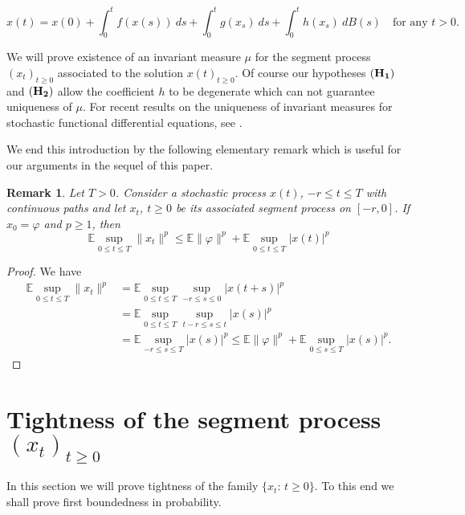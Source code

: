 \documentclass[11pt,reqno,draft]{amsart}
\newtheorem{rem}[defi]{Remark}
\begin{document}
$$
x(t)=x(0)+\int_0^tf(x(s))\:ds+\int_0^tg(x_s)\:ds+\int_0^th(x_s)\:dB(s)\quad
\mbox{for any $t>0$}.
$$

\noindent We will prove existence of an invariant measure $\mu$ for
the segment process $(x_t)_{t\geq0}$ associated to the solution
$x(t)_{t\geq 0}$. Of course our hypotheses ${\bf(H_1)}$ and
${\bf(H_2)}$ allow the coefficient $h$ to be degenerate which can
not guarantee uniqueness of $\mu$. For recent results on the
uniqueness of invariant measures for stochastic functional
differential equations, see \cite{HMS}.

\noindent We end this introduction by the
following elementary remark which is useful for our arguments in the
sequel of this paper.

\begin{rem}
Let $T>0$. Consider a stochastic process $x(t)$, $-r \le t \le T$ with continuous paths
and let $x_t$, $t\geq0$ be its associated segment process on
$[-r,0]$. If $x_0=\varphi$ and $p \ge 1$, then
\begin{equation*}
{\mathbb E}\sup\limits_{0\leq t\leq T}\|x_t\|^p\leq
{\mathbb E}\|\varphi\|^p+{\mathbb E}\sup\limits_{0\leq t\leq T}|x(t)|^p
\end{equation*}
\end{rem}
\begin{proof}
We have
\begin{equation*}
\begin{split}
{\mathbb E}\sup\limits_{0\leq t\leq T}\|x_t\|^p&={\mathbb E}\sup\limits_{0\leq t\leq
T}\sup\limits_{-r\leq s\leq 0}|x(t+s)|^p\\
&={\mathbb E}\sup\limits_{0\leq t\leq T}\sup\limits_{t-r\leq s\leq
t}|x(s)|^p\\
&={\mathbb E}\sup\limits_{-r\leq s\leq T}|x(s)|^p\leq
{\mathbb E}\|\varphi\|^p+{\mathbb E}\sup\limits_{0\leq s\leq T}|x(s)|^p.
\end{split}
\end{equation*}
\end{proof}

\section{Tightness of the segment process $(x_t)_{t\geq 0}$ }
\noindent In this section we will prove tightness of the family
$\{x_t:\, t\geq 0\}$. To this end we shall prove first boundedness
in probability.
\end{document}
